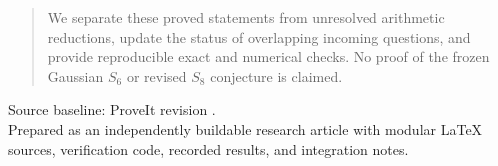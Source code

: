 \begin{titlepage}
\begin{abstract}
We separate these proved statements from unresolved arithmetic
reductions, update the status of overlapping incoming questions, and
provide reproducible exact and numerical checks. No proof of the frozen
Gaussian $S_6$ or revised $S_8$ conjecture is claimed.
\end{abstract}
\vfill
\noindent\small
Source baseline: ProveIt revision
.\\
Prepared as an independently buildable research article with modular
\LaTeX{} sources, verification code, recorded results, and integration notes.
\end{titlepage}
\hypersetup{pageanchor=true}
\tableofcontents
\clearpage
{}








\clearpage
\begin{thebibliography}{99}

\end{thebibliography}

